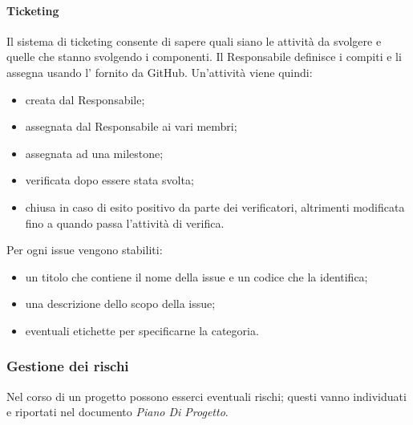 \paragraph{Ticketing} \hfill \break
Il sistema di ticketing consente di sapere quali siano le attività da svolgere e quelle che stanno svolgendo i 
componenti. Il Responsabile definisce i compiti e li assegna usando l' fornito 
da GitHub. Un'attività viene quindi:
\begin{itemize}
    \item creata dal Responsabile;
    \item assegnata dal Responsabile ai vari membri;
    \item assegnata ad una milestone;
    \item verificata dopo essere stata svolta;
    \item chiusa in caso di esito positivo da parte dei verificatori, altrimenti modificata fino a quando passa l'attività di verifica. 
\end{itemize}
Per ogni issue vengono stabiliti:
\begin{itemize}
    \item un titolo che contiene il nome della issue e un codice che la identifica;
    \item una descrizione dello scopo della issue;
    \item eventuali etichette per specificarne la categoria.
\end{itemize}

\subsubsection{Gestione dei rischi}
Nel corso di un progetto possono esserci eventuali rischi; questi vanno individuati e riportati nel documento 
\emph{Piano Di Progetto}.

